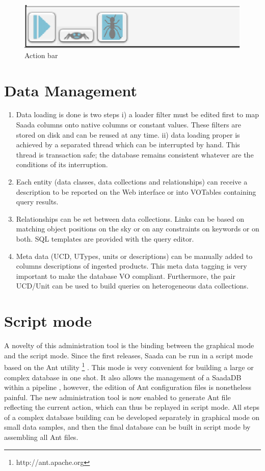 \begin{figure}[!h]
	\begin{center}
		\includegraphics[height=0.10\textwidth]{part8/MICHEL_P18/P18_fig3.eps}
	\end{center}
	\caption{Action bar}
	\label{fig:fig3 (fig. 4)}
\end{figure}

\section{Data Management}
\begin{enumerate}
\item Data loading is done is two steps i) a loader filter must be edited first to map Saada columns onto native columns or constant values. These filters are stored on disk and can be reused at any time. ii) data loading proper is achieved by a separated thread which can be interrupted by hand. This thread is transaction safe; the database remains consistent whatever are the conditions of its interruption.
\item Each entity (data classes, data collections and relationships) can receive a description to be reported on the Web interface or into VOTables containing query results.
\item Relationships can be set between data collections. Links can be based on matching object positions on the sky or on any constraints on keywords or on both. SQL templates are provided with the query editor.
\item Meta data (UCD, UTypes, units or descriptions) can be manually added to columns descriptions of ingested products. This meta data tagging is very important to make the database VO compliant. Furthermore, the pair UCD/Unit can be used to build queries on heterogeneous data collections.
\end{enumerate}

\section{Script mode}
A novelty of this administration tool is the binding between the graphical mode and the script mode.
Since the first releases, Saada can be run in a script mode based on the Ant utility \footnote{http://ant.apache.org} . This mode is very convenient for building a large or complex database in one shot. It also allows the management of a SaadaDB within a pipeline \citep{P03_adassxxii}, however, the edition of Ant configuration files is nonetheless painful. The new administration tool is now enabled to generate Ant file reflecting the current action, which can thus be replayed in script mode. All steps of a complex database building can be developed separately in graphical mode on small data samples, and then the final database can be built in script mode by assembling all Ant files.

